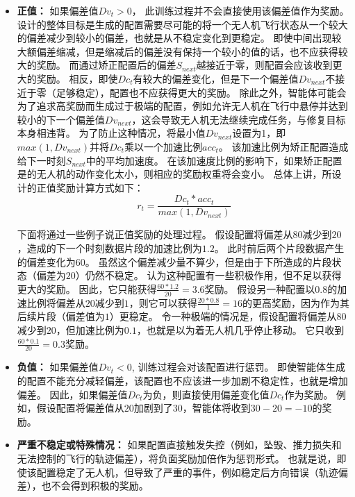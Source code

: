 \begin{itemize}
    \item \textbf{正值：} 如果偏差值$Dv_t>0$， 此训练过程并不会直接使用该偏差值作为奖励。
    \nyctea 设计的整体目标是生成的配置需要尽可能的将一个无人机飞行状态从一个较大的偏差减少到较小的偏差，也就是从不稳定变化到更稳定。
    即使中间出现较大额偏差缩减，但是缩减后的偏差没有保持一个较小的值的话，也不应获得较大的奖励。
    而通过矫正配置后的偏差$S_{next}$越接近于零，则配置会应该收到更大的奖励。
    相反，即使$Dc_t$有较大的偏差变化，但是下一个偏差值$Dv_{next}$不接近于零（足够稳定），配置也不应获得更大的奖励。
    除此之外，智能体可能会为了追求高奖励而生成过于极端的配置，例如允许无人机在飞行中悬停并达到较小的下一个偏差值$Dv_{next}$，这会导致无人机无法继续完成任务，与修复目标本身相违背。
    为了防止这种情况，\nyctea 将最小值$Dv_{next}$设置为1，即 $max(1, Dv_{next})$并将$Dc_t$乘以一个加速比例$acc_t$。
    该加速比例为矫正配置造成给下一时刻$S_{next}$中的平均加速度。
    在该加速度比例的影响下，如果矫正配置是的无人机的动作变化太小，则相应的奖励权重将会变小。
    总体上讲，所设计的正值奖励计算方式如下：
    \begin{equation}
        r_t = \frac{Dc_t * acc_t}{max(1, Dv_{next})}
    \end{equation}

    下面将通过一些例子说正值奖励的处理过程。
    假设配置将偏差从$80$减少到$20$，造成的下一个时刻数据片段的加速比例为$1.2$。
    此时前后两个片段数据产生的偏差变化为$60$。
    虽然这个偏差减少量不算少，但是由于下所造成的片段状态（偏差为$20$）仍然不稳定。
    \nyctea 认为这种配置有一些积极作用，但不足以获得更大的奖励。
    因此，它只能获得$\frac{60*1.2}{20}=3.6$奖励。
    假设另一种配置以$0.8$的加速比例将偏差从$20$减少到$1$，则它可以获得$\frac{20*0.8}{1}=16$的更高奖励，因为作为其后续片段（偏差值为$1$）更稳定。
    令一种极端的情况是，假设配置将偏差从$80$减少到$20$，但加速比例为$0.1$，也就是以为着无人机几乎停止移动。
    它只收到$\frac{60*0.1}{20}=0.3$奖励。

    \item \textbf{负值：} 如果偏差值$Dv_t<0$, 训练过程会对该配置进行惩罚。
    即使智能体生成的配置不能充分减轻偏差，该配置也不应该进一步加剧不稳定性，也就是增加偏差。
    因此，如果偏差值$Dc_t$为负，则\nyctea 直接使用偏差变化值$Dc_t$作为奖励。
    例如，假设配置将偏差值从$20$加剧到了$30$，智能体将收到$30-20 = -10$的奖励。
    

    \item \textbf{严重不稳定或特殊情况：}     
    如果配置直接触发失控（例如，坠毁、推力损失和无法控制的飞行的轨迹偏差），\nyctea 将负面奖励加倍作为惩罚形式。
    也就是说，即使该配置稳定了无人机，但导致了严重的事件，例如稳定后方向错误（轨迹偏差），也不会得到积极的奖励。
    
\end{itemize}


